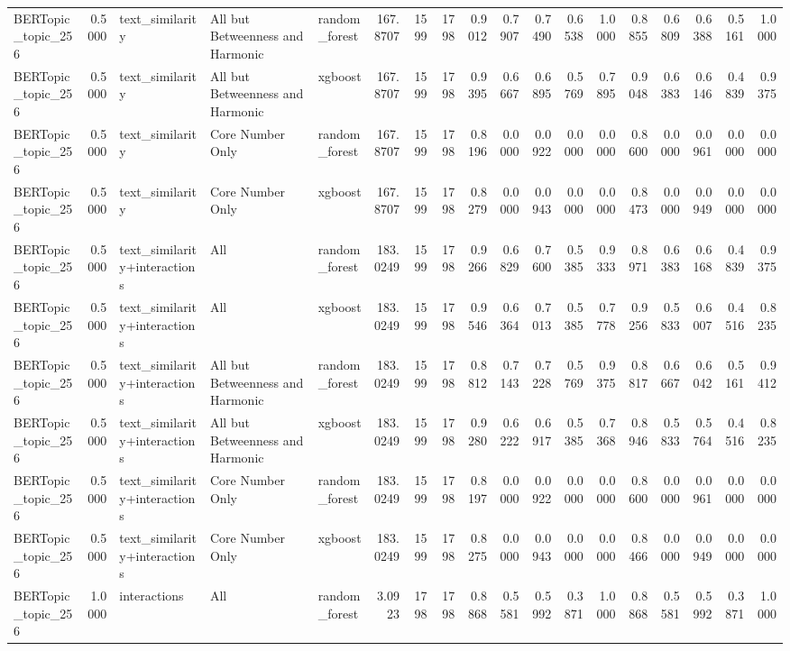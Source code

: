 \begin{tabular}{lrlllrrrrrrrrrrrrr}
BERTopic_topic_256 & 0.5000 & text_similarity & All but Betweenness and Harmonic & random_forest & 167.8707 & 1599 & 1798 & 0.9012 & 0.7907 & 0.7490 & 0.6538 & 1.0000 & 0.8855 & 0.6809 & 0.6388 & 0.5161 & 1.0000 \\
BERTopic_topic_256 & 0.5000 & text_similarity & All but Betweenness and Harmonic & xgboost & 167.8707 & 1599 & 1798 & 0.9395 & 0.6667 & 0.6895 & 0.5769 & 0.7895 & 0.9048 & 0.6383 & 0.6146 & 0.4839 & 0.9375 \\
BERTopic_topic_256 & 0.5000 & text_similarity & Core Number Only & random_forest & 167.8707 & 1599 & 1798 & 0.8196 & 0.0000 & 0.0922 & 0.0000 & 0.0000 & 0.8600 & 0.0000 & 0.0961 & 0.0000 & 0.0000 \\
BERTopic_topic_256 & 0.5000 & text_similarity & Core Number Only & xgboost & 167.8707 & 1599 & 1798 & 0.8279 & 0.0000 & 0.0943 & 0.0000 & 0.0000 & 0.8473 & 0.0000 & 0.0949 & 0.0000 & 0.0000 \\
BERTopic_topic_256 & 0.5000 & text_similarity+interactions & All & random_forest & 183.0249 & 1599 & 1798 & 0.9266 & 0.6829 & 0.7600 & 0.5385 & 0.9333 & 0.8971 & 0.6383 & 0.6168 & 0.4839 & 0.9375 \\
BERTopic_topic_256 & 0.5000 & text_similarity+interactions & All & xgboost & 183.0249 & 1599 & 1798 & 0.9546 & 0.6364 & 0.7013 & 0.5385 & 0.7778 & 0.9256 & 0.5833 & 0.6007 & 0.4516 & 0.8235 \\
BERTopic_topic_256 & 0.5000 & text_similarity+interactions & All but Betweenness and Harmonic & random_forest & 183.0249 & 1599 & 1798 & 0.8812 & 0.7143 & 0.7228 & 0.5769 & 0.9375 & 0.8817 & 0.6667 & 0.6042 & 0.5161 & 0.9412 \\
BERTopic_topic_256 & 0.5000 & text_similarity+interactions & All but Betweenness and Harmonic & xgboost & 183.0249 & 1599 & 1798 & 0.9280 & 0.6222 & 0.6917 & 0.5385 & 0.7368 & 0.8946 & 0.5833 & 0.5764 & 0.4516 & 0.8235 \\
BERTopic_topic_256 & 0.5000 & text_similarity+interactions & Core Number Only & random_forest & 183.0249 & 1599 & 1798 & 0.8197 & 0.0000 & 0.0922 & 0.0000 & 0.0000 & 0.8600 & 0.0000 & 0.0961 & 0.0000 & 0.0000 \\
BERTopic_topic_256 & 0.5000 & text_similarity+interactions & Core Number Only & xgboost & 183.0249 & 1599 & 1798 & 0.8275 & 0.0000 & 0.0943 & 0.0000 & 0.0000 & 0.8466 & 0.0000 & 0.0949 & 0.0000 & 0.0000 \\
BERTopic_topic_256 & 1.0000 & interactions & All & random_forest & 3.0923 & 1798 & 1798 & 0.8868 & 0.5581 & 0.5992 & 0.3871 & 1.0000 & 0.8868 & 0.5581 & 0.5992 & 0.3871 & 1.0000 \\

\end{tabular}
